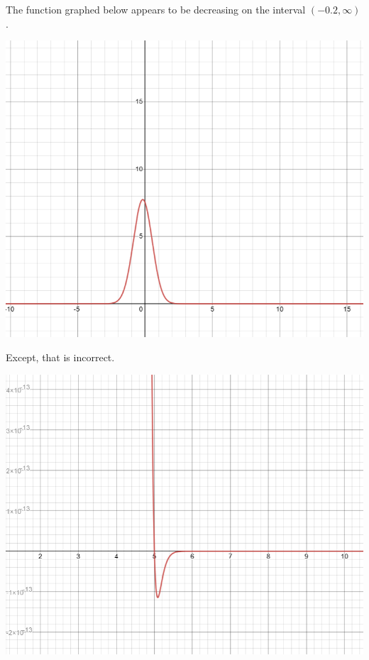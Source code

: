 \documentclass{ximera}
\begin{document}
\newpage


\begin{example}


The function graphed below appears to be decreasing on the interval $(-0.2, \infty)$.

\begin{image}
\includegraphics{pics/graph_3A.png}
\end{image}




Except, that is incorrect.

\begin{image}
\includegraphics{pics/graph_3B.png}
\end{image}



\end{example}
\end{document}
